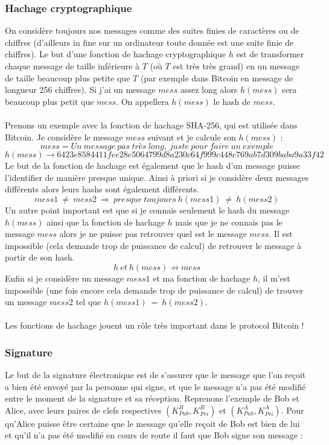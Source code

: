 \documentclass[11pt,a4paper]{article}
\begin{document}
\subsubsection{Hachage cryptographique}

On considère toujours nos messages comme des suites finies de caractères ou de chiffres (d'ailleurs in fine sur un ordinateur toute donnée est une suite finie de chiffres). Le but d'une fonction de hachage cryptographique $h$ est de transformer chaque message de taille inférieure à $T$ (où $T$ est très très grand) en un message de taille beaucoup plus petite que $T$ (par exemple dans Bitcoin en message de longueur 256 chiffres). Si j'ai un message $mess$ assez long alors $h(mess)$ sera beaucoup plus petit que $mess$. On appellera $h(mess)$ le hash de $mess$. \\\\
Prenons un exemple avec la fonction de hachage SHA-256, qui est utilisée dans Bitcoin. Je considère le message $mess$ suivant et je calcule son $h(mess)$ : 
$$mess = Un~message~pas~très ~long, ~juste ~pour ~faire ~un ~exemple $$
$$h(mess) \rightarrow 6423e8584411fee28e5064799d8a230c64f999c448c769ab7d309baba9a33f42$$
Le but de la fonction de hachage est également que le hash d'un message puisse l'identifier de manière presque unique. Ainsi à priori si je considère deux messages différents alors leurs hashs sont également différents.  
$$mess1~ \neq ~mess2~ \Rightarrow ~presque~ toujours~ h(mess1)~ \neq ~h(mess2)$$
Un autre point important est que si je connais seulement le hash du message $h(mess)$ ainsi que la fonction de hachage $h$ mais que je ne connais pas le message $mess$ alors je ne puisse pas retrouver quel est le message $mess$. Il est impossible (cela demande trop de puissance de calcul) de retrouver le message à partir de son hash.
$$ h~ et ~h(mess) \nrightarrow mess$$
Enfin si je considère un message $mess1$ et ma fonction de hachage $h$, il m'est impossible (une fois encore cela demande trop de puissance de calcul) de trouver un message $mess2$ tel que $h(mess1) ~=~ h(mess2)$.\\\\
Les fonctions de hachage jouent un rôle très important dans le protocol Bitcoin !

\subsubsection{Signature}

Le but de la signature électronique est de s'assurer que le message que l'on reçoit a bien été envoyé par la personne qui signe, et que le message n'a pas été modifié entre le moment de la signature et sa réception. Reprenons l'exemple de Bob et Alice, avec leurs paires de clefs respectives $(K_{Pub}^{B}, K_{Pri}^{B})$ et $(K_{Pub}^{A}, K_{Pri}^{A})$. Pour qu'Alice puisse être certaine que le message qu'elle reçoit de Bob est bien de lui et qu'il n'a pas été modifié en cours de route il faut que Bob signe son message :\\
\end{document}
